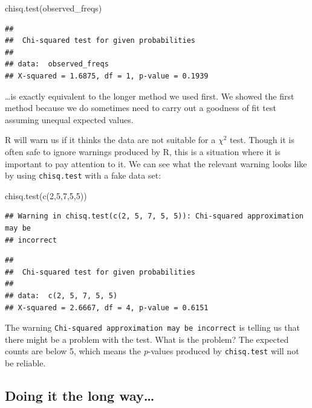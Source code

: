 \documentclass[
]{book}
\newenvironment{Shaded}{\begin{snugshade}}{\end{snugshade}}
\newcommand{\DecValTok}[1]{\textcolor[rgb]{0.00,0.00,0.81}{#1}}
\newcommand{\FunctionTok}[1]{\textcolor[rgb]{0.00,0.00,0.00}{#1}}
\newcommand{\NormalTok}[1]{#1}
\begin{document}
\begin{Shaded}
\begin{Highlighting}[]
\FunctionTok{chisq.test}\NormalTok{(observed\_freqs)}
\end{Highlighting}
\end{Shaded}

\begin{verbatim}
## 
##  Chi-squared test for given probabilities
## 
## data:  observed_freqs
## X-squared = 1.6875, df = 1, p-value = 0.1939
\end{verbatim}

\ldots is exactly equivalent to the longer method we used first. We showed the first method because we do sometimes need to carry out a goodness of fit test assuming unequal expected values.

R will warn us if it thinks the data are not suitable for a \(\chi^{2}\) test. Though it is often safe to ignore warnings produced by R, this is a situation where it is important to pay attention to it. We can see what the relevant warning looks like by using \texttt{chisq.test} with a fake data set:

\begin{Shaded}
\begin{Highlighting}[]
\FunctionTok{chisq.test}\NormalTok{(}\FunctionTok{c}\NormalTok{(}\DecValTok{2}\NormalTok{,}\DecValTok{5}\NormalTok{,}\DecValTok{7}\NormalTok{,}\DecValTok{5}\NormalTok{,}\DecValTok{5}\NormalTok{))}
\end{Highlighting}
\end{Shaded}

\begin{verbatim}
## Warning in chisq.test(c(2, 5, 7, 5, 5)): Chi-squared approximation may be
## incorrect
\end{verbatim}

\begin{verbatim}
## 
##  Chi-squared test for given probabilities
## 
## data:  c(2, 5, 7, 5, 5)
## X-squared = 2.6667, df = 4, p-value = 0.6151
\end{verbatim}

The warning \texttt{Chi-squared\ approximation\ may\ be\ incorrect} is telling us that there might be a problem with the test. What is the problem? The expected counts are below 5, which means the \emph{p}-values produced by \texttt{chisq.test} will not be reliable.

\hypertarget{doing-it-the-long-way}{%
\subsection{Doing it the long way\ldots{}}\label{doing-it-the-long-way}}
\end{document}
